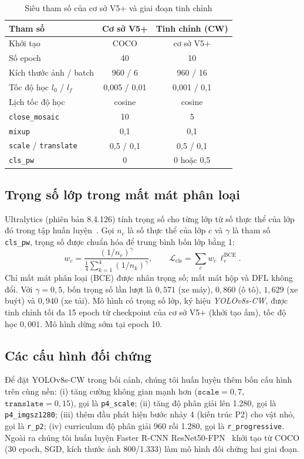 \documentclass[10pt,journal,letterpaper]{IEEEtran}
\begin{document}
\begin{table}[!t]
\caption{Siêu tham số của cơ sở V5+ và giai đoạn tinh chỉnh}
\label{tab:hp}
\centering
\footnotesize
\begin{tabular}{lcc}
\toprule
Tham số & Cơ sở V5+ & Tinh chỉnh (CW) \\
\midrule
Khởi tạo & COCO & cơ sở V5+ \\
Số epoch & 40 & 10 \\
Kích thước ảnh / batch & 960 / 6 & 960 / 16 \\
Tốc độ học $l_0$ / $l_f$ & 0,005 / 0,01 & 0,001 / 0,1 \\
Lịch tốc độ học & cosine & cosine \\
\texttt{close\_mosaic} & 10 & 5 \\
\texttt{mixup} & 0,1 & 0,1 \\
\texttt{scale} / \texttt{translate} & 0,5 / 0,1 & 0,5 / 0,1 \\
\texttt{cls\_pw} & 0 & 0 hoặc 0,5 \\
\bottomrule
\end{tabular}
\end{table}

\subsection{Trọng số lớp trong mất mát phân loại}
Ultralytics (phiên bản 8.4.126) tính trọng số cho từng lớp từ số thực thể của lớp đó trong tập huấn luyện~\cite{ultraloss}. Gọi $n_c$ là số thực thể của lớp $c$ và $\gamma$ là tham số \texttt{cls\_pw}, trọng số được chuẩn hóa để trung bình bốn lớp bằng 1:
\begin{equation}
w_c=\frac{(1/n_c)^{\gamma}}{\frac{1}{4}\sum_{k=1}^{4}(1/n_k)^{\gamma}},\qquad
\mathcal{L}_{\text{cls}}=\sum_{c} w_c\,\ell^{\text{BCE}}_c .
\end{equation}
Chỉ mất mát phân loại (BCE) được nhân trọng số; mất mát hộp và DFL không đổi. Với $\gamma=0{,}5$, bốn trọng số lần lượt là $0{,}571$ (xe máy), $0{,}860$ (ô tô), $1{,}629$ (xe buýt) và $0{,}940$ (xe tải). Mô hình có trọng số lớp, ký hiệu \emph{YOLOv8s-CW}, được tinh chỉnh tối đa 15 epoch từ checkpoint của cơ sở V5+ (khởi tạo ấm), tốc độ học $0{,}001$. Mô hình dừng sớm tại epoch 10.

\subsection{Các cấu hình đối chứng}
Để đặt YOLOv8s-CW trong bối cảnh, chúng tôi huấn luyện thêm bốn cấu hình trên cùng nền: (i) tăng cường không gian mạnh hơn ($\texttt{scale}=0{,}7$, $\texttt{translate}=0{,}15$), gọi là \texttt{p4\_scale}; (ii) tăng độ phân giải lên 1.280, gọi là \texttt{p4\_imgsz1280}; (iii) thêm đầu phát hiện bước nhảy 4 (kiến trúc P2) cho vật nhỏ, gọi là \texttt{r\_p2}; (iv) curriculum độ phân giải 960 rồi 1.280, gọi là \texttt{r\_progressive}. Ngoài ra chúng tôi huấn luyện Faster R-CNN ResNet50-FPN~\cite{tvfrcnn} khởi tạo từ COCO (30 epoch, SGD, kích thước ảnh 800/1.333) làm mô hình đối chứng hai giai đoạn.
\end{document}
